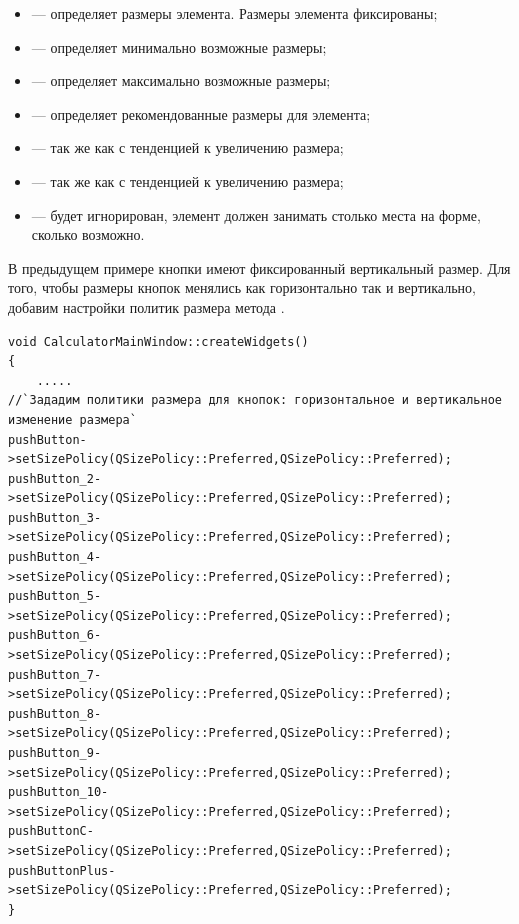 \begin{itemize}
\item {} ---  определяет размеры элемента. Размеры элемента  фиксированы;
\item {} ---   определяет минимально возможные  размеры;
\item {} ---  определяет максимально возможные  размеры;
\item {} ---  определяет рекомендованные размеры для элемента;
\item {} --- так же как  с тенденцией к увеличению  размера;
\item {} --- так же как  с тенденцией к увеличению размера;
\item {} ---  будет игнорирован, элемент должен занимать столько места на
форме, сколько возможно.
\end{itemize}
В предыдущем примере кнопки имеют фиксированный вертикальный размер. Для того, чтобы размеры кнопок менялись как
горизонтально так и вертикально, добавим настройки политик размера метода .
\begin{lstlisting}
void CalculatorMainWindow::createWidgets()
{
	.....
//`Зададим политики размера для кнопок: горизонтальное и вертикальное изменение размера`
pushButton->setSizePolicy(QSizePolicy::Preferred,QSizePolicy::Preferred);
pushButton_2->setSizePolicy(QSizePolicy::Preferred,QSizePolicy::Preferred);
pushButton_3->setSizePolicy(QSizePolicy::Preferred,QSizePolicy::Preferred);
pushButton_4->setSizePolicy(QSizePolicy::Preferred,QSizePolicy::Preferred);
pushButton_5->setSizePolicy(QSizePolicy::Preferred,QSizePolicy::Preferred);
pushButton_6->setSizePolicy(QSizePolicy::Preferred,QSizePolicy::Preferred);
pushButton_7->setSizePolicy(QSizePolicy::Preferred,QSizePolicy::Preferred);
pushButton_8->setSizePolicy(QSizePolicy::Preferred,QSizePolicy::Preferred);
pushButton_9->setSizePolicy(QSizePolicy::Preferred,QSizePolicy::Preferred);
pushButton_10->setSizePolicy(QSizePolicy::Preferred,QSizePolicy::Preferred);
pushButtonC->setSizePolicy(QSizePolicy::Preferred,QSizePolicy::Preferred);
pushButtonPlus->setSizePolicy(QSizePolicy::Preferred,QSizePolicy::Preferred);
}
\end{lstlisting}

